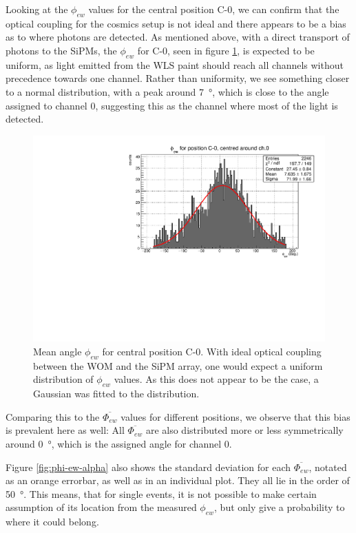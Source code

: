    Looking at the $\phi_{ew}$ values for the central position C-0, we can confirm that the optical coupling for the cosmics setup is not ideal and there appears to be a bias as to where photons are detected. As mentioned above, with a direct transport of photons to the \ac{SiPM}s, the $\phi_{ew}$ for C-0, seen in figure \ref{fig:phi-ew_C0}, is expected to be uniform, as light emitted from the \ac{WLS} paint should reach all channels without precedence towards one channel. Rather than uniformity, we see something closer to a normal distribution, with a peak around \SI{7}{\degree}, which is close to the angle assigned to channel 0, suggesting this as the channel where most of the light is detected.
    
    \begin{figure}[h!]
        \centering
        \includegraphics[width=.7\textwidth]{pictures/phi-ew-c0-fit.pdf}
        \caption{Mean angle $\phi_{ew}$ for central position C-0. With ideal optical coupling between the \ac{WOM} and the \ac{SiPM} array, one would expect a uniform distribution of $\phi_{ew}$ values. As this does not appear to be the case, a Gaussian was fitted to the distribution.}
        \label{fig:phi-ew_C0}
    \end{figure}
    
    Comparing this to the $\overline{\Phi_{ew}}$ values for different positions, we observe that this bias is prevalent here as well: All $\overline{\Phi_{ew}}$ are also distributed more or less symmetrically around \SI{0}{\degree}, which is the assigned angle for channel 0. 
    
    Figure \ref{fig:phi-ew-alpha} also shows the standard deviation for each $\overline{\Phi_{ew}}$, notated as an orange errorbar, as well as in an individual plot. They all lie in the order of \SI{50}{\degree}. This means, that for single events, it is not possible to make certain assumption of its location from the measured $\phi_{ew}$, but only give a probability to where it could belong.
    
